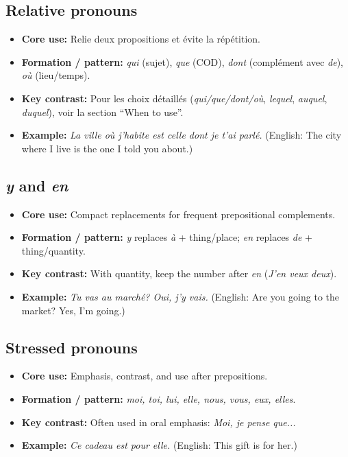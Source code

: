 \documentclass{article}
\begin{document}
\subsection{Relative pronouns}
\begin{itemize}
    \item \textbf{Core use:} Relie deux propositions et évite la répétition.
    \item \textbf{Formation / pattern:} \textit{qui} (sujet), \textit{que} (COD), \textit{dont} (complément avec \textit{de}), \textit{où} (lieu/temps).
    \item \textbf{Key contrast:} Pour les choix détaillés (\textit{qui/que/dont/où}, \textit{lequel}, \textit{auquel}, \textit{duquel}), voir la section ``When to use''.
    \item \textbf{Example:} \textit{La ville où j'habite est celle dont je t'ai parlé.} (English: The city where I live is the one I told you about.)
\end{itemize}

\subsection{\textit{y} and \textit{en}}
\begin{itemize}
    \item \textbf{Core use:} Compact replacements for frequent prepositional complements.
    \item \textbf{Formation / pattern:} \textit{y} replaces \textit{à} + thing/place; \textit{en} replaces \textit{de} + thing/quantity.
    \item \textbf{Key contrast:} With quantity, keep the number after \textit{en} (\textit{J'en veux deux}).
    \item \textbf{Example:} \textit{Tu vas au marché? Oui, j'y vais.} (English: Are you going to the market? Yes, I'm going.)
\end{itemize}

\subsection{Stressed pronouns}
\begin{itemize}
    \item \textbf{Core use:} Emphasis, contrast, and use after prepositions.
    \item \textbf{Formation / pattern:} \textit{moi, toi, lui, elle, nous, vous, eux, elles}.
    \item \textbf{Key contrast:} Often used in oral emphasis: \textit{Moi, je pense que...}
    \item \textbf{Example:} \textit{Ce cadeau est pour elle.} (English: This gift is for her.)
\end{itemize}
\end{document}
